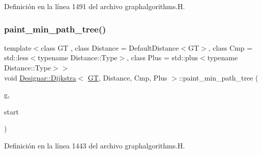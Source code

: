Definición en la línea 1491 del archivo graphalgorithms.\+H.

\mbox{\label{class_designar_1_1_dijkstra_a607872c03f2e6de59936118e6f6c8790}} 
\subsubsection{\texorpdfstring{paint\+\_\+min\+\_\+path\+\_\+tree()}{paint\_min\_path\_tree()}}
{\footnotesize\ttfamily template$<$class GT , class Distance  = Default\+Distance$<$\+G\+T$>$, class Cmp  = std\+::less$<$typename Distance\+::\+Type$>$, class Plus  = std\+::plus$<$typename Distance\+::\+Type$>$$>$ \\
void \hyperlink{class_designar_1_1_dijkstra}{Designar\+::\+Dijkstra}$<$ \hyperlink{demo-buildgraph_8_c_a3001c40d2c31ca87ed96cd7d1334a55e}{GT}, Distance, Cmp, Plus $>$\+::paint\+\_\+min\+\_\+path\+\_\+tree (\begin{DoxyParamCaption}\item[{\hyperlink{demo-buildgraph_8_c_a3001c40d2c31ca87ed96cd7d1334a55e}{GT} \&}]{g,  }\item[{\hyperlink{class_designar_1_1_dijkstra_afeb644fc5395569ec366f0d220ab477d}{Node} \&}]{start }\end{DoxyParamCaption})\hspace{0.3cm}{\ttfamily [inline]}}



Definición en la línea 1443 del archivo graphalgorithms.\+H.

\mbox{\label{class_designar_1_1_dijkstra_ab2d75c571dff03279bea0192047461f0}} 
